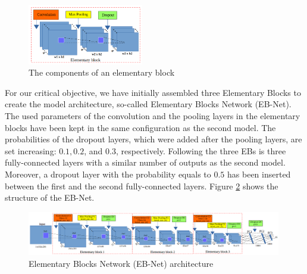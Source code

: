 \documentclass[review]{elsarticle}
\begin{document}
\begin{figure}[h!]
	\centering
	\includegraphics[width=0.45\textwidth]{images/eblock}
	\caption{The components of an elementary block}
	\label{figeblock}
\end{figure}

For our critical objective, we have initially assembled three Elementary Blocks to create the model architecture, so-called Elementary Blocks Network (EB-Net). The used parameters of the convolution and the pooling layers in the elementary blocks have been kept in the same configuration as the second model. The probabilities of the dropout layers, which were added after the pooling layers, are set increasing: $0.1, 0.2$, and $0.3$, respectively. Following the three EBs is three fully-connected layers with a similar number of outputs as the second model. Moreover, a dropout layer with the probability equals to $0.5$ has been inserted between the first and the second fully-connected layers. Figure \ref{figebnet} shows the structure of the EB-Net.

\begin{figure}[h!]
	\centering
	\includegraphics[width=0.99\textwidth]{images/arch_model}
	\caption{Elementary Blocks Network (EB-Net) architecture}
	\label{figebnet}
\end{figure}
\end{document}
